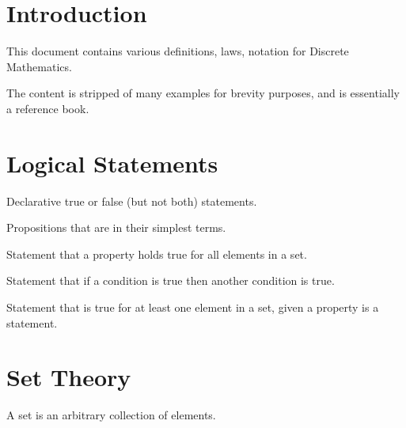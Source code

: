 \documentclass[11pt]{article}
\begin{document}



\tableofcontents

\section{Introduction}


This document contains various definitions, laws, notation for Discrete Mathematics.

The content is stripped of many examples for brevity purposes, and is essentially a reference book.

\section{Logical Statements}

\begin{definition}[Propositions]\label{def:props}
Declarative true or false (but not both) statements.
\end{definition}

\begin{definition}\label{def:prims}
Propositions that are in their simplest terms.
\end{definition}

\begin{definition}\label{def:universal-stmts}
Statement that a property holds true for all elements in a set.
\end{definition}

\begin{definition}\label{def:cond-stmts}
Statement that if a condition is true then another condition is true.
\end{definition}

\begin{definition}\label{def:exist-stmts}
Statement that is true for at least one element in a set, given a property is a statement.
\end{definition}

\section{Set Theory}

\begin{definition}[Set]\label{def:set}
    A set is an arbitrary collection of elements.
\end{definition}
\end{document}
